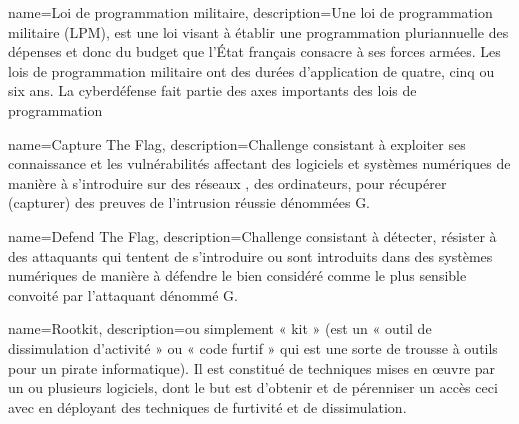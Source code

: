%
%


{
name={Loi de programmation militaire},
description={Une loi de programmation militaire (LPM), est une loi visant à établir une programmation pluriannuelle des dépenses et donc du budget que l'État français consacre à ses forces armées. Les lois de programmation militaire ont des durées d'application de quatre, cinq ou six ans. La cyberdéfense fait partie des axes importants des lois de programmation}
}

{
name={Capture The Flag},
description={Challenge consistant à exploiter ses connaissance et les vulnérabilités affectant des logiciels  et systèmes numériques de manière à s’introduire sur des réseaux , des ordinateurs, pour récupérer (capturer) des preuves de l’intrusion réussie dénommées G.}
}

{
name={Defend The Flag},
description={Challenge consistant à détecter, résister à des attaquants qui tentent de s'introduire ou sont introduits dans des systèmes numériques de manière à défendre le bien considéré comme le plus sensible convoité par l'attaquant dénommé G.}
}


{
name={Rootkit},
description={ou simplement « kit » (est un « outil de dissimulation d'activité » ou  « code furtif » qui est une sorte de trousse à outils pour un pirate informatique). Il est constitué  de techniques mises en œuvre par un ou plusieurs logiciels, dont le but est d'obtenir et de pérenniser un accès ceci avec en déployant des techniques de furtivité et de dissimulation.}
}




